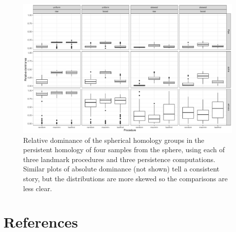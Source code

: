 \documentclass[
]{article}
\begin{document}
\begin{figure}
\includegraphics[width=\textwidth]{../figures/homology-sphere-relative}
\caption{
Relative dominance of the spherical homology groups in the persistent homology of four samples from the sphere, using each of three landmark procedures and three persistence computations. Similar plots of absolute dominance (not shown) tell a consistent story, but the distributions are more skewed so the comparisons are less clear.
\label{fig:sphere}
}
\end{figure}

\hypertarget{references}{%
\section{References}\label{references}}
\end{document}
